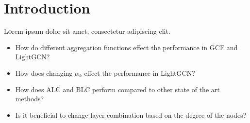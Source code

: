 \section{Introduction}
\lettrine[nindent=0em,lines=3]{L} orem ipsum dolor sit amet, consectetur adipiscing elit.
%

\begin{itemize}
    \item How do different aggregation functions effect the performance in GCF and LightGCN?
    \item How does changing $\alpha_k$ effect the performance in LightGCN?
    \item How does ALC and BLC perform compared to other state of the art methods?
    \item Is it beneficial to change layer combination based on the degree of the nodes?
\end{itemize}

